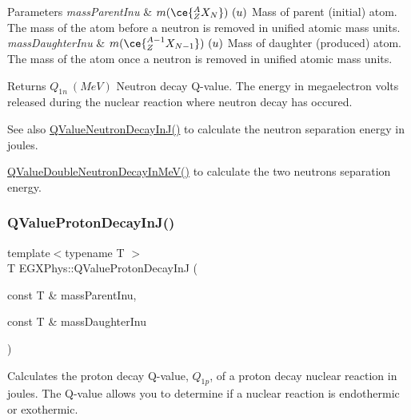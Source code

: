 \begin{DoxyParams}{Parameters}
{\em mass\+Parent\+Inu} & $m(\ce{ ^{A}_{Z}X_{N} })\ (u)$ Mass of parent (initial) atom. The mass of the atom before a neutron is removed in unified atomic mass units. \\
\hline
{\em mass\+Daughter\+Inu} & $m(\ce{ ^{A-1}_{Z}X_{N-1} })\ (u)$ Mass of daughter (produced) atom. The mass of the atom once a neutron is removed in unified atomic mass units. \\
\hline
\end{DoxyParams}
\begin{DoxyReturn}{Returns}
$Q_{1n}\ (MeV)$ Neutron decay Q-\/value. The energy in megaelectron volts released during the nuclear reaction where neutron decay has occured. 
\end{DoxyReturn}
\begin{DoxySeeAlso}{See also}
\hyperlink{group___q_value_gab9ffbd12c3f814e03f0ed1fbdcba0700}{Q\+Value\+Neutron\+Decay\+In\+J()} to calculate the neutron separation energy in joules. 

\hyperlink{group___q_value_ga6bfea723aca78b32ea67cc1ca7b4031b}{Q\+Value\+Double\+Neutron\+Decay\+In\+Me\+V()} to calculate the two neutrons separation energy. 
\end{DoxySeeAlso}
\mbox{\label{group___q_value_gaa344322393356bd442d17c992628218a}} 
\subsubsection{\texorpdfstring{Q\+Value\+Proton\+Decay\+In\+J()}{QValueProtonDecayInJ()}}
{\footnotesize\ttfamily template$<$typename T $>$ \\
T E\+G\+X\+Phys\+::\+Q\+Value\+Proton\+Decay\+InJ (\begin{DoxyParamCaption}\item[{const T \&}]{mass\+Parent\+Inu,  }\item[{const T \&}]{mass\+Daughter\+Inu }\end{DoxyParamCaption})}



Calculates the proton decay Q-\/value, $Q_{1p}$, of a proton decay nuclear reaction in joules. The Q-\/value allows you to determine if a nuclear reaction is endothermic or exothermic. 

